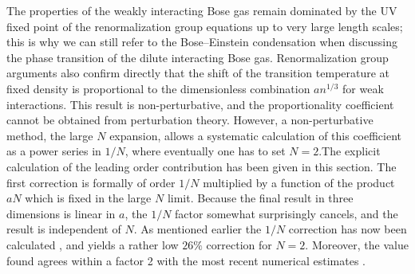 The properties of the weakly
interacting Bose gas remain dominated by the UV fixed point of the
renormalization
group equations up to very large length scales; this is why we can still
refer to the
Bose--Einstein condensation when discussing the phase transition of the
dilute interacting
Bose gas.  Renormalization group arguments also  confirm
directly that the
shift of the transition temperature at fixed density is proportional to the
dimensionless
combination
$an^{1/3}$ for weak interactions.  This result is non-perturbative, and the
proportionality
coefficient cannot be obtained from perturbation theory.  However, a non-perturbative method, the large $N$ expansion,  allows a
systematic calculation of this coefficient as a power series in $1/N$, where
eventually one has to set $N=2$.The explicit calculation of  the
leading order contribution has been given in this section.  The first correction is formally of order $1/N$
multiplied by a function of the product $aN$ which is fixed in the large $N$
limit.  Because the final result in three dimensions is linear in $a$, the
$1/N$ factor somewhat surprisingly cancels, and the result is independent of
$N$.  As mentioned earlier the $1/N$ correction has now been calculated
\rPA, and yields a rather low $26\%$ correction for $N=2$.
Moreover, the value found agrees within a factor 2 with the most recent numerical estimates .


